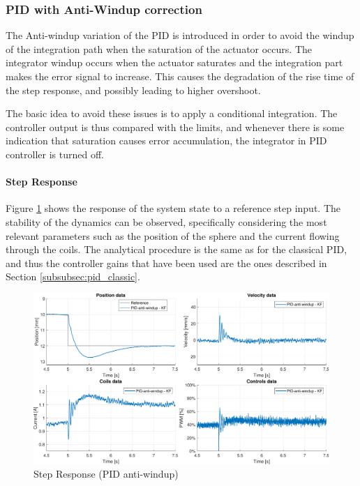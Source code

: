 \subsubsection{PID with Anti-Windup correction}
\label{subsubsec:pid_anti_windup}

The Anti-windup variation of the PID is introduced in order to avoid the windup of the integration path when the saturation of the actuator occurs.
The integrator windup occurs when the actuator saturates and the integration part makes the error signal to increase.
This causes the degradation of the rise time of the step response, and possibly leading to higher overshoot.

The basic idea to avoid these issues is to apply a conditional integration.
The controller output is thus compared with the limits, and whenever there is some indication that saturation causes error accumulation, the integrator in PID controller is turned off.

\paragraph{Step Response}

Figure \ref{fig:pid_anti_windup_step_response} shows the response of the system state to a reference step input.
The stability of the dynamics can be observed, specifically considering the most relevant parameters such as the position of the sphere and the current flowing through the coils.
The analytical procedure is the same as for the classical PID, and thus the controller gains that have been used are the ones described in Section \ref{subsubsec:pid_classic}.

\begin{figure}[H]
    \centering
    \includegraphics[width=1\linewidth]{./img/MATLAB/results/step_PID_anti_windup_KF.pdf}
    \caption{Step Response (PID anti-windup)}
    \label{fig:pid_anti_windup_step_response}
\end{figure}



